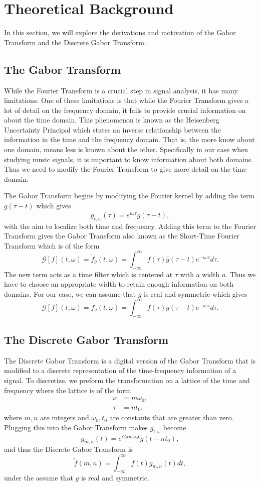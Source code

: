 \documentclass[12pt]{article}%
\begin{document}
\section{Theoretical Background}

In this section, we will explore the derivations and motivation of the Gabor Transform and the Discrete Gabor Transform. 


\subsection{The Gabor Transform}

While the Fourier Transform is a crucial step in signal analysis, it has many limitations. One of these limitations is that while the Fourier Transform gives a lot of detail on the frequency domain, it fails to provide crucial information on about the time domain. This phenomenon is known as the Heisenberg Uncertainty Principal which states an inverse relationship between the information in the time and the frequency domain. That is, the more know about one domain, means less is known about the other. Specifically in our case when studying music signals, it is important to know information about both domains. Thus we need to modify the Fourier Transform to give more detail on the time domain.

The Gabor Transform begins by modifying the Fourier kernel by adding the term $g(\tau - t)$ which gives
\[ 
    g_{t,w}(\tau) = e^{i \omega \tau}g(\tau - t),
\]
with the aim to localize both time and frequency. Adding this term to the Fourier Transform gives the Gabor Transform also known as the Short-Time Fourier Transform which is of the form
\[ 
    \mathcal{G}[f](t,\omega) = \tilde{f}_g(t,\omega) = \int_{-\infty}^{\infty}f(\tau) \bar{g}(\tau - t)e^{-i\omega \tau}d\tau.
\]
The new term acts as a time filter which is centered at $\tau$ with a width $a$. Thus we have to choose an appropriate width to retain enough information on both domains. For our case, we can assume that $g$ is real and symmetric which gives 
\[ 
    \mathcal{G}[f](t,\omega) = \tilde{f}_g(t,\omega) = \int_{-\infty}^{\infty}f(\tau) g(\tau - t)e^{-i\omega \tau}d\tau.
\]

\subsection{The Discrete Gabor Transform}
The Discrete Gabor Transform is a digital version of the Gabor Transform that is modified to a discrete representation of the time-frequency information of a signal. To discretize, we preform the transformation on a lattice of the time and frequency where the lattice is of the form
\begin{align*}
    \nu &= m\omega_0,\\
    \tau &= nt_0,
\end{align*}
where $m,n$ are integers and $\omega_0,t_0$ are constants that are greater than zero. Plugging this into the Gabor Transform makes $g_{t,\omega}$ become
\[ 
    g_{m,n}(t) = e^{i2\pi m\omega_0 t}g(t-nt_0),
\]
and thus the Discrete Gabor Transform is
\[ 
    \tilde{f}(m,n) = \int_{-\infty}^{\infty}f(t)g_{m,n}(t)dt,
\]
under the assume that $g$ is real and symmetric.
\end{document}
